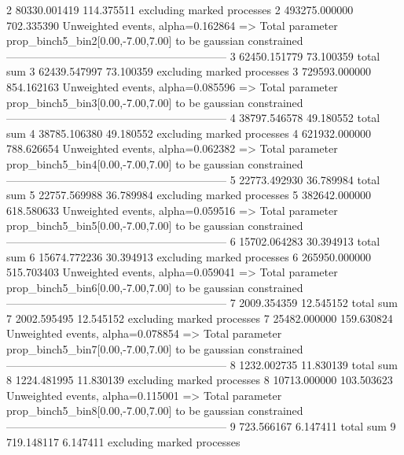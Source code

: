 2          80330.001419    114.375511      excluding marked processes    
2          493275.000000   702.335390      Unweighted events, alpha=0.162864
  => Total parameter prop_binch5_bin2[0.00,-7.00,7.00] to be gaussian constrained
------------------------------------------------------------
3          62450.151779    73.100359       total sum                     
3          62439.547997    73.100359       excluding marked processes    
3          729593.000000   854.162163      Unweighted events, alpha=0.085596
  => Total parameter prop_binch5_bin3[0.00,-7.00,7.00] to be gaussian constrained
------------------------------------------------------------
4          38797.546578    49.180552       total sum                     
4          38785.106380    49.180552       excluding marked processes    
4          621932.000000   788.626654      Unweighted events, alpha=0.062382
  => Total parameter prop_binch5_bin4[0.00,-7.00,7.00] to be gaussian constrained
------------------------------------------------------------
5          22773.492930    36.789984       total sum                     
5          22757.569988    36.789984       excluding marked processes    
5          382642.000000   618.580633      Unweighted events, alpha=0.059516
  => Total parameter prop_binch5_bin5[0.00,-7.00,7.00] to be gaussian constrained
------------------------------------------------------------
6          15702.064283    30.394913       total sum                     
6          15674.772236    30.394913       excluding marked processes    
6          265950.000000   515.703403      Unweighted events, alpha=0.059041
  => Total parameter prop_binch5_bin6[0.00,-7.00,7.00] to be gaussian constrained
------------------------------------------------------------
7          2009.354359     12.545152       total sum                     
7          2002.595495     12.545152       excluding marked processes    
7          25482.000000    159.630824      Unweighted events, alpha=0.078854
  => Total parameter prop_binch5_bin7[0.00,-7.00,7.00] to be gaussian constrained
------------------------------------------------------------
8          1232.002735     11.830139       total sum                     
8          1224.481995     11.830139       excluding marked processes    
8          10713.000000    103.503623      Unweighted events, alpha=0.115001
  => Total parameter prop_binch5_bin8[0.00,-7.00,7.00] to be gaussian constrained
------------------------------------------------------------
9          723.566167      6.147411        total sum                     
9          719.148117      6.147411        excluding marked processes    
